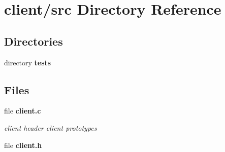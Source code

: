 \section{client/src Directory Reference}
\label{dir_b565d458ba0ce2faccd0ea2cd60c04eb}
\subsection*{Directories}
\begin{DoxyCompactItemize}
\item 
directory {\bf tests}
\end{DoxyCompactItemize}
\subsection*{Files}
\begin{DoxyCompactItemize}
\item 
file {\bf client.\-c}
\begin{DoxyCompactList}\small\item\em client header client prototypes \end{DoxyCompactList}\item 
file {\bf client.\-h}
\end{DoxyCompactItemize}
